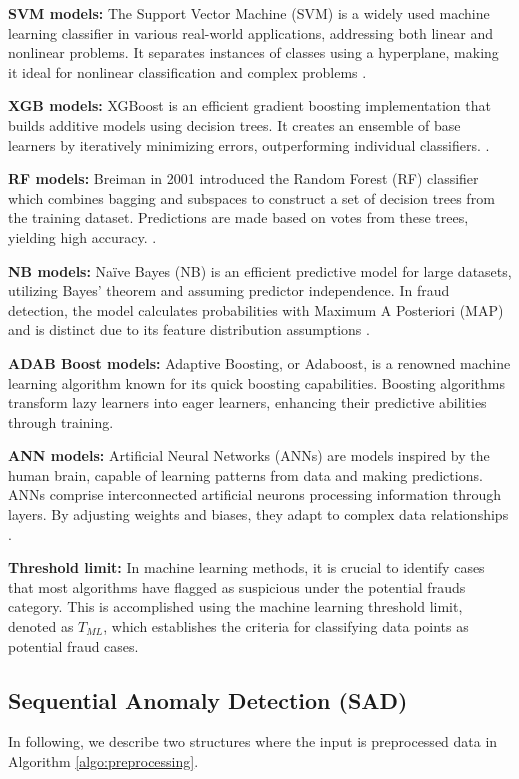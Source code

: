 \documentclass[12pt]{article}
\begin{document}
\textbf{\small SVM models:} The Support Vector Machine (SVM) is a
widely used machine learning classifier in various real-world
applications, addressing both linear and nonlinear problems. It
separates instances of classes using a hyperplane, making it ideal
for nonlinear classification and complex problems \cite{A52}.

    \textbf{\small XGB models:}
XGBoost is an efficient gradient boosting implementation that
builds additive models using decision trees. It creates an
ensemble of base learners by iteratively minimizing errors,
outperforming individual classifiers. \cite{A57}.

    \textbf{\small RF models:}
Breiman in 2001 introduced the Random Forest (RF) classifier which
combines bagging and subspaces to construct a set of decision
trees from the training dataset. Predictions are made based on
votes from these trees, yielding high accuracy.
\cite{A52}.

\textbf{\small NB models:} Na\"ive Bayes (NB) is an efficient
predictive model for large datasets, utilizing Bayes' theorem and
assuming predictor independence. In fraud detection, the model
calculates probabilities with Maximum A Posteriori (MAP) and is
distinct due to its feature distribution assumptions \cite{A52}.

    \textbf{\small ADAB Boost models:}
Adaptive Boosting, or Adaboost, is a renowned machine learning
algorithm known for its quick boosting capabilities. Boosting
algorithms transform lazy learners into eager learners, enhancing
their predictive abilities through training\cite{A52}.

    \textbf{\small ANN models:}
Artificial Neural Networks (ANNs) are models inspired by the human
brain, capable of learning patterns from data and making
predictions. ANNs comprise interconnected artificial neurons
processing information through layers. By adjusting weights and
biases, they adapt to complex data relationships \cite{A52}.


    \textbf{\small Threshold limit:}
In machine learning methods, it is crucial to identify cases that
most algorithms have flagged as suspicious under the potential
frauds category. This is accomplished using the machine learning
threshold limit, denoted as $T_{ML}$, which establishes the
criteria for classifying data points as potential fraud cases.

\subsection{Sequential Anomaly Detection (SAD)}\label{SSC:SAD}
In following, we describe two structures where the
input is preprocessed data in Algorithm \ref{algo:preprocessing}.
\end{document}
